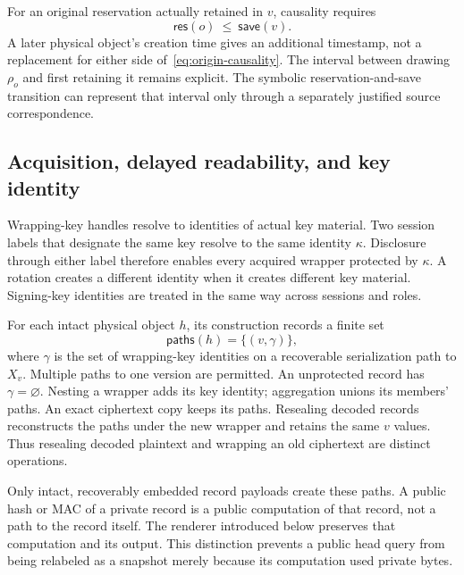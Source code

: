 For an original reservation actually retained in $v$, causality requires
\begin{equation}
  \mathsf{res}(o)\ \leq\ \mathsf{save}(v).
  \label{eq:origin-causality}
\end{equation}
A later physical object's creation time gives an additional timestamp, not a
replacement for either side of~\eqref{eq:origin-causality}.  The interval
between drawing $\rho_o$ and first retaining it remains explicit.  The
symbolic reservation-and-save transition can represent that interval only
through a separately justified source correspondence.

\subsection{Acquisition, delayed readability, and key identity}

Wrapping-key handles resolve to identities of actual key material.  Two
session labels that designate the same key resolve to the same identity
$\kappa$.  Disclosure through either label therefore enables every acquired
wrapper protected by $\kappa$.  A rotation creates a different identity when
it creates different key material.  Signing-key identities are treated in
the same way across sessions and roles.

For each intact physical object $h$, its construction records a finite set
\[
  \mathsf{paths}(h)=\{(v,\gamma)\},
\]
where $\gamma$ is the set of wrapping-key identities on a recoverable
serialization path to $X_v$.  Multiple paths to one version are permitted.
An unprotected record has $\gamma=\varnothing$.  Nesting a wrapper adds its
key identity; aggregation unions its members' paths.  An exact ciphertext
copy keeps its paths.  Resealing decoded records reconstructs the paths under
the new wrapper and retains the same $v$ values.  Thus resealing decoded
plaintext and wrapping an old ciphertext are distinct operations.

Only intact, recoverably embedded record payloads create these paths.  A
public hash or MAC of a private record is a public computation of that record,
not a path to the record itself.  The renderer introduced below preserves
that computation and its output.  This distinction prevents a public head
query from being relabeled as a snapshot merely because its computation used
private bytes.

